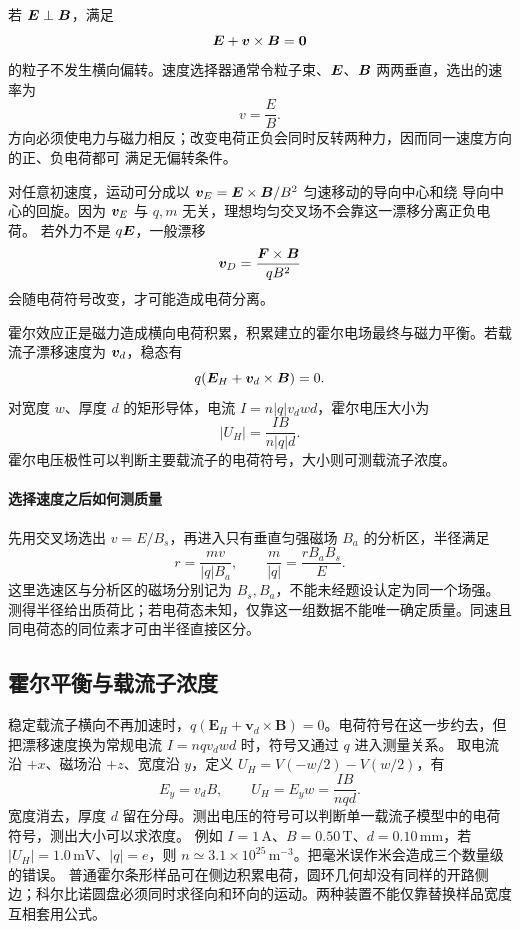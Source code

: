 {若 $\bm{E}\perp\bm{B}$，满足
\begin{equation}
 \bm{E}+\bm{v}\times\bm{B}=\bm{0}
\end{equation}
的粒子不发生横向偏转。速度选择器通常令粒子束、$\bm{E}$、$\bm{B}$ 两两垂直，选出的速率为
\begin{equation}
 \boxed{v=\frac EB}.
\end{equation}
方向必须使电力与磁力相反；改变电荷正负会同时反转两种力，因而同一速度方向的正、负电荷都可
满足无偏转条件。

对任意初速度，运动可分成以 $\bm{v}_E=\bm{E}\times\bm{B}/B^2$ 匀速移动的导向中心和绕
导向中心的回旋。因为 $\bm{v}_E$ 与 $q,m$ 无关，理想均匀交叉场不会靠这一漂移分离正负电荷。
若外力不是 $q\bm{E}$，一般漂移
\begin{equation}
 \bm{v}_D=\frac{\bm{F}\times\bm{B}}{qB^2}
\end{equation}
会随电荷符号改变，才可能造成电荷分离。

霍尔效应正是磁力造成横向电荷积累，积累建立的霍尔电场最终与磁力平衡。若载流子漂移速度为
$\bm{v}_d$，稳态有
\begin{equation}
 q(\bm{E}_H+\bm{v}_d\times\bm{B})=0.
\end{equation}
对宽度 $w$、厚度 $d$ 的矩形导体，电流 $I=n|q|v_dwd$，霍尔电压大小为
\begin{equation}
 \boxed{|U_H|=\frac{IB}{n|q|d}}.
\end{equation}
霍尔电压极性可以判断主要载流子的电荷符号，大小则可测载流子浓度。


\paragraph{选择速度之后如何测质量}
先用交叉场选出 $v=E/B_s$，再进入只有垂直匀强磁场 $B_a$ 的分析区，半径满足
\[
 r=\frac{mv}{|q|B_a},\qquad
 \frac m{|q|}=\frac{rB_aB_s}{E}.
\]
这里选速区与分析区的磁场分别记为 $B_s,B_a$，不能未经题设认定为同一个场强。测得半径给出质荷比；若电荷态未知，仅靠这一组数据不能唯一确定质量。同速且同电荷态的同位素才可由半径直接区分。


\subsection{霍尔平衡与载流子浓度}
稳定载流子横向不再加速时，$q(\boldsymbol E_H+\boldsymbol v_d\times\boldsymbol B)=0$。电荷符号在这一步约去，但把漂移速度换为常规电流 $I=nqv_dwd$ 时，符号又通过 $q$ 进入测量关系。
取电流沿 $+x$、磁场沿 $+z$、宽度沿 $y$，定义 $U_H=V(-w/2)-V(w/2)$，有
\[
 E_y=v_dB,\qquad U_H=E_yw=\frac{IB}{nqd}.
\]
宽度消去，厚度 $d$ 留在分母。测出电压的符号可以判断单一载流子模型中的电荷符号，测出大小可以求浓度。
例如 $I=1\,\mathrm A$、$B=0.50\,\mathrm T$、$d=0.10\,\mathrm{mm}$，若 $|U_H|=1.0\,\mathrm{mV}$、$|q|=e$，则 $n\simeq3.1\times10^{25}\,\mathrm{m^{-3}}$。把毫米误作米会造成三个数量级的错误。
普通霍尔条形样品可在侧边积累电荷，圆环几何却没有同样的开路侧边；科尔比诺圆盘必须同时求径向和环向的运动。两种装置不能仅靠替换样品宽度互相套用公式。


}
